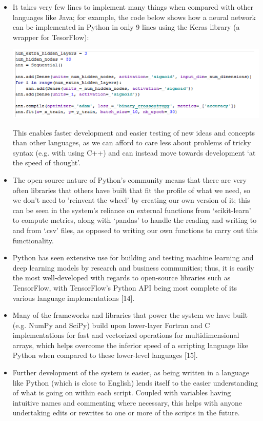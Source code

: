 \documentclass[12pt,twoside]{report}
\begin{document}
\begin{itemize}
	\item It takes very few lines to implement many things when compared with other languages like Java; for example, the code below shows how a neural network can be implemented in Python in only 9 lines using the Keras library (a wrapper for TesorFlow):
\begin{center}
\includegraphics[scale=0.8]{project_figures/fig4_1}
\end{center}
	This enables faster development and easier testing of new ideas and concepts than other languages, as we can afford to care less about problems of tricky syntax (e.g. with using C++) and can instead move towards development ‘at the speed of thought’.
	\item The open-source nature of Python's community means that there are very often libraries that others have built that fit the profile of what we need, so we don't need to 'reinvent the wheel' by creating our own version of it; this can be seen in the system’s reliance on external functions from ‘scikit-learn’ to compute metrics, along with ‘pandas’ to handle the reading and writing to and from ‘.csv’ files, as opposed to writing our own functions to carry out this functionality.
	\item Python has seen extensive use for building and testing machine learning and deep learning models by research and business communities; thus, it is easily the most well-developed with regards to open-source libraries such as TensorFlow, with TensorFlow's Python API being most complete of its various language implementations [14].
	\item Many of the frameworks and libraries that power the system we have built (e.g. NumPy and SciPy) build upon lower-layer Fortran and C implementations for fast and vectorized operations for multidimensional arrays, which helps overcome the inferior speed of a scripting language like Python when compared to these lower-level languages [15].
	\item Further development of the system is easier, as being written in a language like Python (which is close to English) lends itself to the easier understanding of what is going on within each script. Coupled with variables having intuitive names and commenting where necessary, this helps with anyone undertaking edits or rewrites to one or more of the scripts in the future.
\end{itemize}
\end{document}

